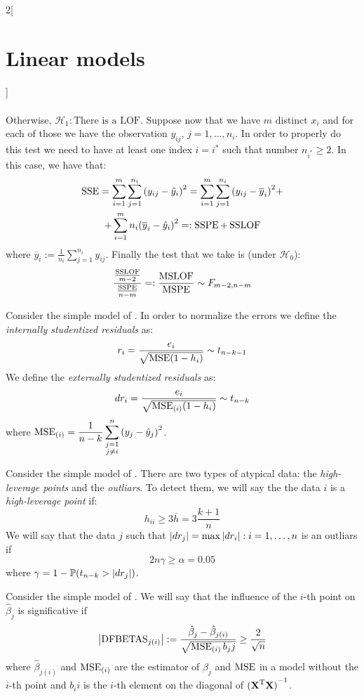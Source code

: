 \documentclass[../../../main_math.tex]{subfiles}
\begin{document}
\begin{multicols}{2}[\section{Linear models}]
\begin{proposition}
\begin{align*}
    \end{align*}
    Otherwise, $\mathcal{H}_1: \text{There is a LOF}$.
    Suppose now that we have $m$ distinct $x_i$ and for each of those we have the observation $y_{ij}$, $j=1,\ldots,n_i$. In order to properly do this test we need to have at least one index $i=i^*$ such that number $n_{i^*}\geq 2$. In this case, we have that:
    \begin{multline*}
      \operatorname{SSE}=\sum_{i=1}^m\sum_{j=1}^{n_i}{(y_{ij}-\hat{y}_i)}^2 =\sum_{i=1}^m\sum_{j=1}^{n_i}{(y_{ij}-\overline{y}_i)}^2+\\+\sum_{i=1}^mn_i{(\overline{y}_i-\hat{y}_i)}^2=:\operatorname{SSPE}+\operatorname{SSLOF}
    \end{multline*}
    where $\overline{y}_i:=\frac{1}{n_i}\sum_{j=1}^{n_i}y_{ij}$. Finally the test that we take is (under $\mathcal{H}_0$):
    $$\frac{\frac{\operatorname{SSLOF}}{m-2}}{\frac{\operatorname{SSPE}}{n-m}}=:\frac{\operatorname{MSLOF}}{\operatorname{MSPE}}\sim F_{m-2,n-m}$$
  \end{proposition}
  \begin{definition}
    Consider the simple model of . In order to normalize the errors we define the \emph{internally studentized residuals} as: $$r_i=\frac{e_i}{\sqrt{\operatorname{MSE}(1-h_i)}}\sim t_{n-k-1}$$
    We define the \emph{externally studentized residuals} as: $$dr_i=\frac{e_i}{\sqrt{\operatorname{MSE}_{(i)}(1-h_i)}}\sim t_{n-k}$$ where $\displaystyle\operatorname{MSE}_{(i)}=\frac{1}{n-k}\sum_{\substack{j=1\\j\ne i}}^n{(y_j-\hat{y}_j)}^2$.
  \end{definition}
  \begin{definition}
    Consider the simple model of . There are two types of atypical data: the \emph{high-leverage points} and the \emph{outliars}.
    To detect them, we will say the the data $i$ is a \emph{high-leverage point} if: $$h_{ii}\geq 3\overline{h}=3\frac{k+1}{n}$$
    We will say that the data $j$ such that $\abs{dr_j}=\max{\abs{dr_i}:i=1,\ldots,n}$ is an outliars if $$2n\gamma\geq \alpha=0.05$$ where $\gamma=1-\mathbb{P}(t_{n-k}>\abs{dr_j})$.
  \end{definition}
  \begin{definition}
    Consider the simple model of . We will say that the influence of the $i$-th point on $\hat\beta_j$ is significative if $$\abs{\mathrm{DFBETAS}_{j(i)}}:=\frac{\hat\beta_j-\hat\beta_{j(i)}}{\sqrt{\operatorname{MSE}_{(i)}b_jj}}\geq \frac{2}{\sqrt{n}}$$ where $\hat\beta_{j(i)}$ and $\operatorname{MSE}_{(i)}$ are the estimator of $\hat\beta_j$ and $\operatorname{MSE}$ in a model without the $i$-th point and $b_ii$ is the $i$-th element on the diagonal of ${({\boldsymbol{\mathrm{X}}}^{\mathrm{T}}\boldsymbol{\mathrm{X}})}^{-1}$.

\end{definition}
\end{multicols}
\end{document}
